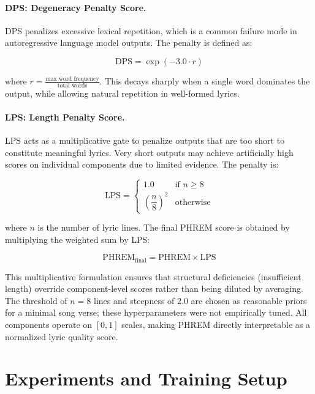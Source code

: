\documentclass[11pt]{article}
\begin{document}
\paragraph{DPS: Degeneracy Penalty Score.}
DPS penalizes excessive lexical repetition, which is a common failure mode 
in autoregressive language model outputs. The penalty is defined as:

\begin{equation}
\text{DPS} = \exp(-3.0 \cdot r)
\end{equation}

where $r = \frac{\text{max word frequency}}{\text{total words}}$. This 
decays sharply when a single word dominates the output, while allowing 
natural repetition in well-formed lyrics.

\paragraph{LPS: Length Penalty Score.}
LPS acts as a multiplicative gate to penalize outputs that are too short to 
constitute meaningful lyrics. Very short outputs may achieve artificially 
high scores on individual components due to limited evidence. The penalty is:

\begin{equation}
\text{LPS} = \begin{cases} 1.0 & \text{if } n \geq 8 \\ 
\left(\dfrac{n}{8}\right)^{2} & \text{otherwise} \end{cases}
\end{equation}

where $n$ is the number of lyric lines. The final PHREM score is obtained by 
multiplying the weighted sum by LPS:

\begin{equation}
\text{PHREM}_{\text{final}} = \text{PHREM} \times \text{LPS}
\end{equation}

This multiplicative formulation ensures that structural deficiencies 
(insufficient length) override component-level scores rather than being 
diluted by averaging. The threshold of $n = 8$ lines and steepness of 2.0 
are chosen as reasonable priors for a minimal song verse; these 
hyperparameters were not empirically tuned. All components operate on 
$[0,1]$ scales, making PHREM directly interpretable as a normalized 
lyric quality score.

\section{Experiments and Training Setup}
\end{document}
